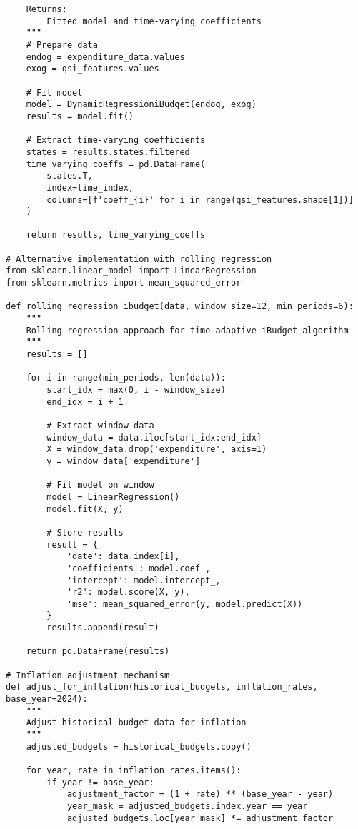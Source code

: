 \documentclass[12pt]{article}
\begin{document}
\begin{lstlisting}
    Returns:
        Fitted model and time-varying coefficients
    """
    # Prepare data
    endog = expenditure_data.values
    exog = qsi_features.values
    
    # Fit model
    model = DynamicRegressioniBudget(endog, exog)
    results = model.fit()
    
    # Extract time-varying coefficients
    states = results.states.filtered
    time_varying_coeffs = pd.DataFrame(
        states.T, 
        index=time_index,
        columns=[f'coeff_{i}' for i in range(qsi_features.shape[1])]
    )
    
    return results, time_varying_coeffs

# Alternative implementation with rolling regression
from sklearn.linear_model import LinearRegression
from sklearn.metrics import mean_squared_error

def rolling_regression_ibudget(data, window_size=12, min_periods=6):
    """
    Rolling regression approach for time-adaptive iBudget algorithm
    """
    results = []
    
    for i in range(min_periods, len(data)):
        start_idx = max(0, i - window_size)
        end_idx = i + 1
        
        # Extract window data
        window_data = data.iloc[start_idx:end_idx]
        X = window_data.drop('expenditure', axis=1)
        y = window_data['expenditure']
        
        # Fit model on window
        model = LinearRegression()
        model.fit(X, y)
        
        # Store results
        result = {
            'date': data.index[i],
            'coefficients': model.coef_,
            'intercept': model.intercept_,
            'r2': model.score(X, y),
            'mse': mean_squared_error(y, model.predict(X))
        }
        results.append(result)
    
    return pd.DataFrame(results)

# Inflation adjustment mechanism
def adjust_for_inflation(historical_budgets, inflation_rates, base_year=2024):
    """
    Adjust historical budget data for inflation
    """
    adjusted_budgets = historical_budgets.copy()
    
    for year, rate in inflation_rates.items():
        if year != base_year:
            adjustment_factor = (1 + rate) ** (base_year - year)
            year_mask = adjusted_budgets.index.year == year
            adjusted_budgets.loc[year_mask] *= adjustment_factor
    

\end{lstlisting}
\end{document}
